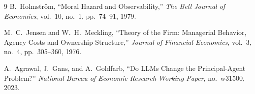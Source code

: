 \documentclass[11pt]{article}
\begin{document}
\begin{thebibliography}{9}
B.~Holmstr{\"o}m,
``Moral Hazard and Observability,''
\emph{The Bell Journal of Economics}, vol.~10, no.~1, pp.~74--91, 1979.

M.~C.~Jensen and W.~H.~Meckling,
``Theory of the Firm: Managerial Behavior, Agency Costs and Ownership Structure,''
\emph{Journal of Financial Economics}, vol.~3, no.~4, pp.~305--360, 1976.

A.~Agrawal, J.~Gans, and A.~Goldfarb,
``Do LLMs Change the Principal-Agent Problem?''
\emph{National Bureau of Economic Research Working Paper}, no.~w31500, 2023.
\end{thebibliography}
\end{document}
